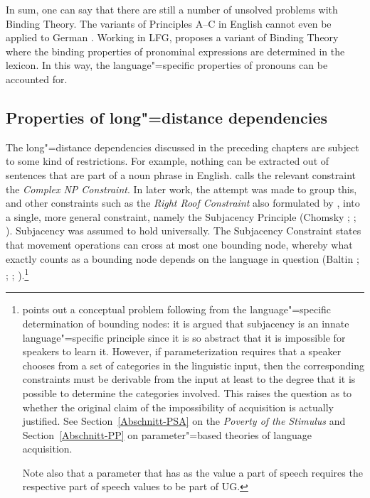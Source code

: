 In sum, one can say that there are still a number of unsolved problems with Binding Theory. The
\hpsg variants of Principles A--C in English cannot
even be applied to German \citep[Chapter~20]{Mueller99a}. Working in LFG, \citet{Dalrymple93a} proposes a variant of Binding Theory where the binding
properties of pronominal expressions are determined in the lexicon. In this way, the language"=specific properties of pronouns can be accounted for.

\subsection{Properties of long"=distance dependencies}
\label{Abschnitt-Fernabhängigkeiten}

The 
long"=distance dependencies discussed in the preceding chapters are subject to some kind of
restrictions. For example, nothing can be extracted out of sentences that are part of a noun phrase
in English. \citet[]{Ross67} calls the relevant constraint the \emph{Complex NP
  Constraint}. In later work, the attempt was made to group this, and
other constraints such as the \emph{Right Roof Constraint} also formulated
by  \citet[Section~5.1.2]{Ross67}, into a single, more general constraint, namely the Subjacency
Principle (Chomsky \citeyear[]{Chomsky73a}; \citeyear[]{Chomsky86b};
\citealp{Baltin81a,Baltin2006a}). Subjacency was assumed to hold universally. The Subjacency
Constraint states that movement operations can cross at most one bounding node,
whereby what exactly counts as a bounding node depends on the language in question (Baltin \citeyear[]{Baltin81a};
\citeyear{Baltin2006a}; \citealp[]{Rizzi82b}; \citealp[--40]{Chomsky86b}).\footnote{%
	 \citet[--540]{Newmeyer2004a} points out a conceptual problem following from the language"=specific determination of bounding nodes: it is argued
	 that subjacency is an innate language"=specific principle since it is so abstract that it is impossible for speakers to learn it. However, if parameterization
	 requires that a speaker chooses from  a set of categories in the linguistic input, then the corresponding constraints must be derivable from the input at least to
	 the degree that it is possible to determine the categories involved. This raises the question as to whether the original claim of the impossibility of acquisition
	 is actually justified. See Section~\ref{Abschnitt-PSA} on the  \emph{Poverty of the Stimulus}
	 and Section~\ref{Abschnitt-PP} on parameter"=based theories of language
         acquisition.

         Note also that a parameter that has as the value a part of speech requires the respective
         part of speech values to be part of UG.
}

